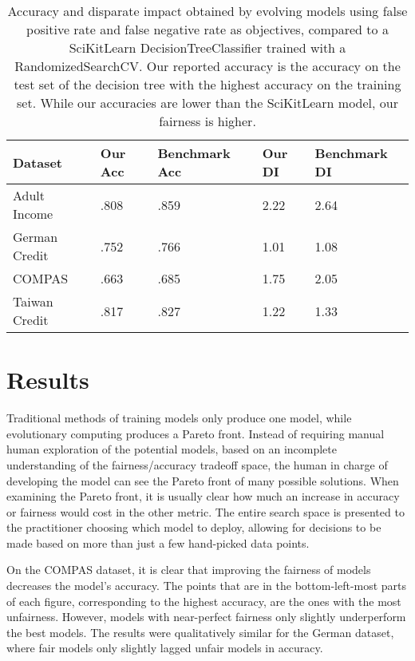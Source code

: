 \documentclass{elsarticle}
\begin{document}
\renewcommand{\arraystretch}{1.5}
\begin{table}
	\begin{center}
	\begin{tabular}{| l | l | l | l | l |}
	\hline Dataset & Our Acc & Benchmark Acc & Our DI & Benchmark DI
	\\ \hline Adult Income  & .808 & .859 & 2.22 & 2.64
	\\ \hline German Credit & .752 & .766 & 1.01 & 1.08
	\\ \hline COMPAS        & .663 & .685 & 1.75 & 2.05
	\\ \hline Taiwan Credit & .817 & .827 & 1.22 & 1.33
	\\ \hline
	\end{tabular}
	\end{center}
	\caption{Accuracy and disparate impact obtained by evolving models using false positive rate and false negative rate as objectives, compared to a SciKitLearn DecisionTreeClassifier trained with a RandomizedSearchCV. Our reported accuracy is the accuracy on the test set of the decision tree with the highest accuracy on the training set. While our accuracies are lower than the SciKitLearn model, our fairness is higher.}
\end{table}

\section{Results}	
Traditional methods of training models only produce one model, while evolutionary computing produces a Pareto front.  Instead of requiring manual human exploration of the potential models, based on an incomplete understanding of the fairness/accuracy tradeoff space, the human in charge of developing the model can see the Pareto front of many possible solutions. When examining the Pareto front, it is usually clear how much an increase in accuracy or fairness would cost in the other metric. The entire search space is presented to the practitioner choosing which model to deploy, allowing for decisions to be made based on more than just a few hand-picked data points.

On the COMPAS dataset, it is clear that improving the fairness of models decreases the model’s accuracy. The points that are in the bottom-left-most parts of each figure, corresponding to the highest accuracy, are the ones with the most unfairness. However, models with near-perfect fairness only slightly underperform the best models. The results were qualitatively similar for the German dataset, where fair models only slightly lagged unfair models in accuracy. 
\end{document}
